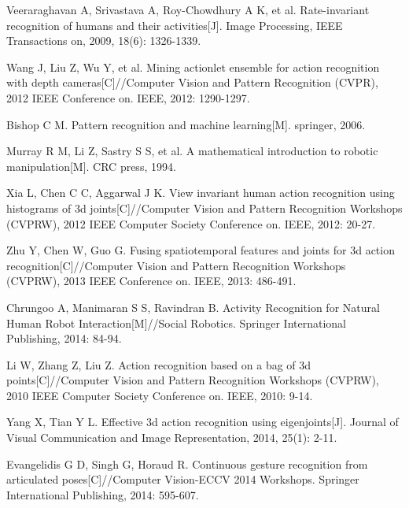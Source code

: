 \documentclass[conference]{IEEEtran}
\begin{document}
\begin{thebibliography}{1}
Veeraraghavan A, Srivastava A, Roy-Chowdhury A K, et al. Rate-invariant recognition of humans and their activities[J]. Image Processing, IEEE Transactions on, 2009, 18(6): 1326-1339.

Wang J, Liu Z, Wu Y, et al. Mining actionlet ensemble for action recognition with depth cameras[C]//Computer Vision and Pattern Recognition (CVPR), 2012 IEEE Conference on. IEEE, 2012: 1290-1297.

Bishop C M. Pattern recognition and machine learning[M]. springer, 2006.

Murray R M, Li Z, Sastry S S, et al. A mathematical introduction to robotic manipulation[M]. CRC press, 1994.

Xia L, Chen C C, Aggarwal J K. View invariant human action recognition using histograms of 3d joints[C]//Computer Vision and Pattern Recognition Workshops (CVPRW), 2012 IEEE Computer Society Conference on. IEEE, 2012: 20-27.

Zhu Y, Chen W, Guo G. Fusing spatiotemporal features and joints for 3d action recognition[C]//Computer Vision and Pattern Recognition Workshops (CVPRW), 2013 IEEE Conference on. IEEE, 2013: 486-491.

Chrungoo A, Manimaran S S, Ravindran B. Activity Recognition for Natural Human Robot Interaction[M]//Social Robotics. Springer International Publishing, 2014: 84-94.

Li W, Zhang Z, Liu Z. Action recognition based on a bag of 3d points[C]//Computer Vision and Pattern Recognition Workshops (CVPRW), 2010 IEEE Computer Society Conference on. IEEE, 2010: 9-14.

Yang X, Tian Y L. Effective 3d action recognition using eigenjoints[J]. Journal of Visual Communication and Image Representation, 2014, 25(1): 2-11.

Evangelidis G D, Singh G, Horaud R. Continuous gesture recognition from articulated poses[C]//Computer Vision-ECCV 2014 Workshops. Springer International Publishing, 2014: 595-607.

\end{thebibliography}

\end{document}
